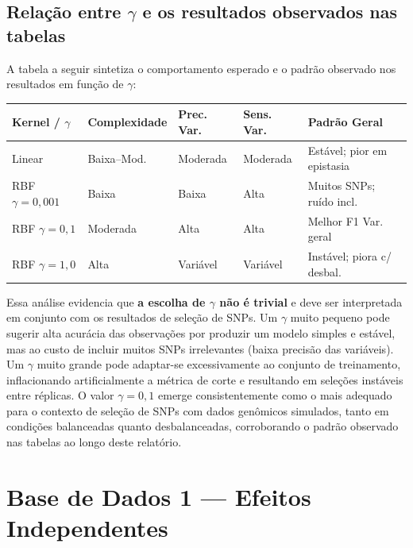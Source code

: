 \documentclass[12pt,a4paper]{article}
\newcommand{\novo}[1]{\textcolor{corNova}{#1}}
\renewcommand{\arraystretch}{1.3}
\begin{document}
\novo{\subsection*{Relação entre $\gamma$ e os resultados observados nas tabelas}}

\novo{A tabela a seguir sintetiza o comportamento esperado e o padrão observado nos resultados em função de $\gamma$:}

\begin{center}
\footnotesize
\setlength{\tabcolsep}{4pt}
\renewcommand{\arraystretch}{1.4}
\begin{tabular}{L{2.5cm}|C{2.2cm}|C{2.2cm}|C{2.2cm}|C{3.0cm}}
  \textbf{Kernel / $\gamma$} & \textbf{Complexidade} & \textbf{Prec. Var.} & \textbf{Sens. Var.} & \textbf{Padrão Geral} \\
  \hline
  Linear & Baixa--Mod. & Moderada & Moderada & Estável; pior em epistasia \\
  \hline
  RBF $\gamma=0{,}001$ & Baixa & Baixa & Alta & Muitos SNPs; ruído incl. \\
  \hline
  RBF $\gamma=0{,}1$ & Moderada & Alta & Alta & Melhor F1 Var. geral \\
  \hline
  RBF $\gamma=1{,}0$ & Alta & Variável & Variável & Instável; piora c/ desbal. \\
\end{tabular}
\end{center}
\renewcommand{\arraystretch}{1.3}

\novo{Essa análise evidencia que \textbf{a escolha de $\gamma$ não é trivial} e deve ser interpretada em conjunto com os resultados de seleção de SNPs. Um $\gamma$ muito pequeno pode sugerir alta acurácia das observações por produzir um modelo simples e estável, mas ao custo de incluir muitos SNPs irrelevantes (baixa precisão das variáveis). Um $\gamma$ muito grande pode adaptar-se excessivamente ao conjunto de treinamento, inflacionando artificialmente a métrica de corte e resultando em seleções instáveis entre réplicas. O valor $\gamma = 0{,}1$ emerge consistentemente como o mais adequado para o contexto de seleção de SNPs com dados genômicos simulados, tanto em condições balanceadas quanto desbalanceadas, corroborando o padrão observado nas tabelas ao longo deste relatório.}

\section{\novo{Base de Dados 1 --- Efeitos Independentes}}
\end{document}

